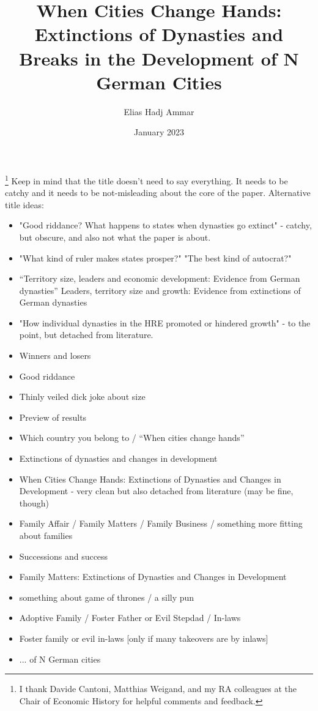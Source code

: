 \documentclass{article}
\title{When Cities Change Hands: Extinctions of Dynasties and \\Breaks in the Development of N German Cities}
\author{Elias Hadj Ammar}
\date{January 2023}
\begin{document}
\maketitle
\footnote{I thank Davide Cantoni, Matthias Weigand, and my RA colleagues at the Chair of Economic History for helpful comments and feedback.}
Keep in mind that the title doesn't need to say everything. It needs to be catchy and it needs to be not-misleading about the core of the paper.
Alternative title ideas: 
\begin{itemize}
    \item "Good riddance? What happens to states when dynasties go extinct" - catchy, but obscure, and also not what the paper is about.
    \item "What kind of ruler makes states prosper?" "The best kind of autocrat?"
    \item ``Territory size, leaders and economic development: Evidence from German dynasties'' {Leaders, territory size and growth: Evidence from extinctions of German dynasties}

    \item "How individual dynasties in the HRE promoted or hindered growth" - to the point, but detached from literature.
    \item Winners and losers
    \item Good riddance
    \item Thinly veiled dick joke about size
    \item Preview of results
    \item Which country you belong to / ``When cities change hands''
    \item {Extinctions of dynasties and changes in development}
    \item {When Cities Change Hands: Extinctions of Dynasties and Changes in Development} - very clean but also detached from literature (may be fine, though)
    \item Family Affair / Family Matters / Family Business / something more fitting about families
    \item Successions and success
    \item {Family Matters: Extinctions of Dynasties and Changes in Development}
    \item something about game of thrones / a silly pun
    \item Adoptive Family / Foster Father or Evil Stepdad / In-laws
    \item Foster family or evil in-laws [only if many takeovers are by inlaws]
    \item ... of N German cities
\end{itemize}
\end{document}
